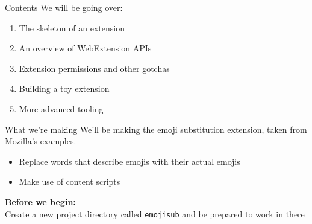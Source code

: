 \documentclass[../index.tex]{subfiles}
\begin{document}

\renewcommand{\currenttitle}{Contents}
\begin{frame}{\currenttitle}
  We will be going over:
  \begin{enumerate}
    \item The skeleton of an extension
    \item An overview of WebExtension APIs
    \item Extension permissions and other gotchas
    \item Building a toy extension
    \item More advanced tooling
  \end{enumerate}
\end{frame}

\renewcommand{\currenttitle}{What we're making}
\begin{frame}[fragile]{\currenttitle}
  We'll be making the emoji substitution extension, taken from Mozilla's
  examples.

  \begin{itemize}
    \item Replace words that describe emojis with their actual emojis
    \item Make use of content scripts
  \end{itemize}

  \vspace*{2em}

  \textbf{Before we begin:} \\
  Create a new project directory called \texttt{emojisub} and be prepared to
  work in there

\end{frame}

\end{document}
